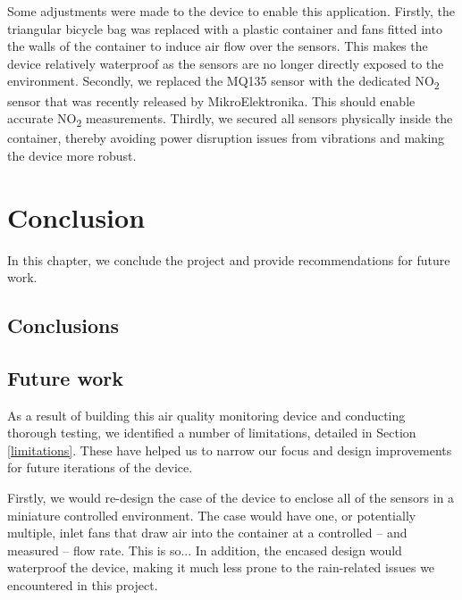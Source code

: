 \documentclass[11pt]{report}
\begin{document}
Some adjustments were made to the device to enable this application. Firstly, the triangular bicycle bag was replaced with a plastic container and fans fitted into the walls of the container to induce air flow over the sensors. This makes the device relatively waterproof as the sensors are no longer directly exposed to the environment. Secondly, we replaced the MQ135 sensor with the dedicated NO\textsubscript{2} sensor that was recently released by MikroElektronika. This should enable accurate NO\textsubscript{2} measurements. Thirdly, we secured all sensors physically inside the container, thereby avoiding power disruption issues from vibrations and making the device more robust.



\chapter{Conclusion} \label{chap: conclusion}

In this chapter, we conclude the project and provide recommendations for future work.

\section{Conclusions}

\section{Future work}

As a result of building this air quality monitoring device and conducting thorough testing, we identified a number of limitations, detailed in Section \ref{limitations}. These have helped us to narrow our focus and design improvements for future iterations of the device.

Firstly, we would re-design the case of the device to enclose all of the sensors in a miniature controlled environment. The case would have one, or potentially multiple, inlet fans that draw air into the container at a controlled -- and measured -- flow rate. This is so... In addition, the encased design would waterproof the device, making it much less prone to the rain-related issues we encountered in this project.
\end{document}
